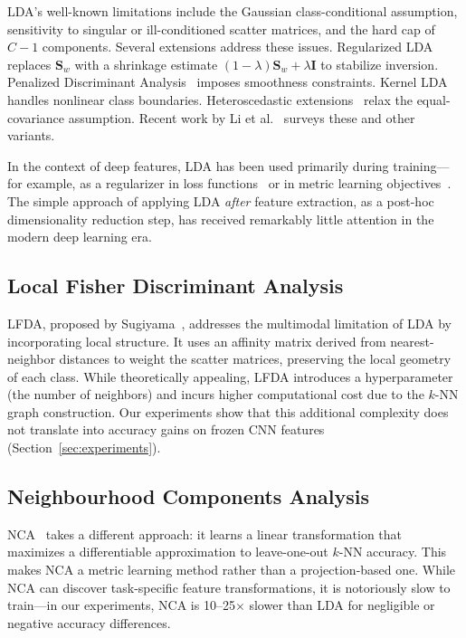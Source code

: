 LDA's well-known limitations include the Gaussian class-conditional assumption, sensitivity to singular or ill-conditioned scatter matrices, and the hard cap of $C-1$ components. Several extensions address these issues. Regularized LDA~\cite{friedman1989regularized} replaces $\mathbf{S}_w$ with a shrinkage estimate $(1-\lambda)\mathbf{S}_w + \lambda\mathbf{I}$ to stabilize inversion. Penalized Discriminant Analysis~\cite{hastie1995penalized} imposes smoothness constraints. Kernel LDA~\cite{mika1999fisher} handles nonlinear class boundaries. Heteroscedastic extensions~\cite{loog2004lda_review} relax the equal-covariance assumption. Recent work by Li et al.~\cite{li2022survey_dr} surveys these and other variants.

In the context of deep features, LDA has been used primarily during training---for example, as a regularizer in loss functions~\cite{dorfer2016deep_lda} or in metric learning objectives~\cite{wen2016discriminative}. The simple approach of applying LDA \emph{after} feature extraction, as a post-hoc dimensionality reduction step, has received remarkably little attention in the modern deep learning era.

\subsection{Local Fisher Discriminant Analysis}

LFDA, proposed by Sugiyama~\cite{sugiyama2007lfda}, addresses the multimodal limitation of LDA by incorporating local structure. It uses an affinity matrix derived from nearest-neighbor distances to weight the scatter matrices, preserving the local geometry of each class. While theoretically appealing, LFDA introduces a hyperparameter (the number of neighbors) and incurs higher computational cost due to the $k$-NN graph construction. Our experiments show that this additional complexity does not translate into accuracy gains on frozen CNN features (Section~\ref{sec:experiments}).

\subsection{Neighbourhood Components Analysis}

NCA~\cite{goldberger2004nca} takes a different approach: it learns a linear transformation that maximizes a differentiable approximation to leave-one-out $k$-NN accuracy. This makes NCA a metric learning method rather than a projection-based one. While NCA can discover task-specific feature transformations, it is notoriously slow to train---in our experiments, NCA is 10--25$\times$ slower than LDA for negligible or negative accuracy differences.

